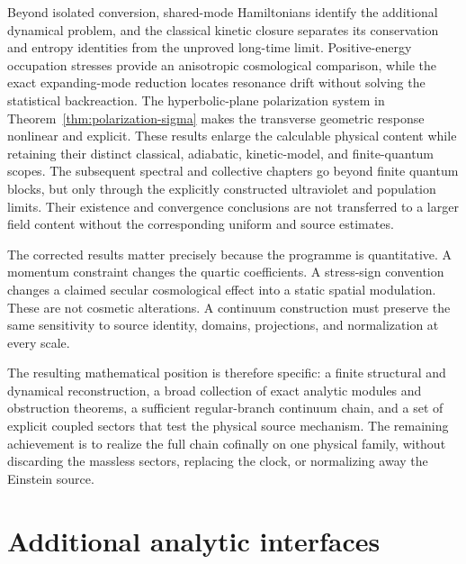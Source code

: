 \documentclass[11pt,a4paper,oneside]{book}
\theoremstyle{plain}
\theoremstyle{definition}
\theoremstyle{remark}
\begin{document}
Beyond isolated conversion, shared-mode Hamiltonians identify the
additional dynamical problem, and the classical kinetic closure separates
its conservation and entropy identities from the unproved long-time
limit.  Positive-energy occupation stresses provide an anisotropic
cosmological comparison, while the exact expanding-mode reduction locates
resonance drift without solving the statistical backreaction.  The
hyperbolic-plane polarization system in
Theorem~\ref{thm:polarization-sigma} makes the transverse geometric
response nonlinear and explicit.  These results enlarge the calculable
physical content while retaining their distinct classical, adiabatic,
kinetic-model, and finite-quantum scopes.  The subsequent spectral and
collective chapters go beyond finite quantum blocks, but only through
the explicitly constructed ultraviolet and population limits.  Their
existence and convergence conclusions are not transferred to a larger
field content without the corresponding uniform and source estimates.

The corrected results matter precisely because the programme is quantitative. A momentum constraint changes the quartic coefficients. A stress-sign convention changes a claimed secular cosmological effect into a static spatial modulation. These are not cosmetic alterations. A continuum construction must preserve the same sensitivity to source identity, domains, projections, and normalization at every scale.

The resulting mathematical position is therefore specific: a finite structural and dynamical reconstruction, a broad collection of exact analytic modules and obstruction theorems, a sufficient regular-branch continuum chain, and a set of explicit coupled sectors that test the physical source mechanism. The remaining achievement is to realize the full chain cofinally on one physical family, without discarding the massless sectors, replacing the clock, or normalizing away the Einstein source.


\appendix
\chapter{Additional analytic interfaces}
\label{app:interfaces}
\end{document}
